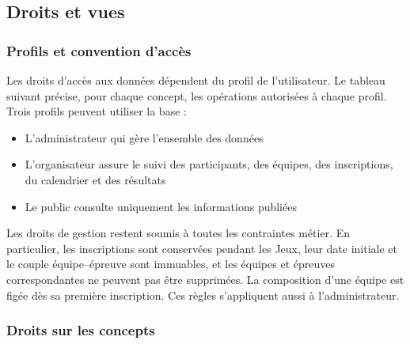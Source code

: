 \subsection{Droits et vues}

\subsubsection{Profils et convention d'accès}

Les droits d'accès aux données dépendent du profil de l'utilisateur. Le tableau suivant précise, pour chaque concept, les opérations autorisées à chaque profil. Trois profils peuvent utiliser la base : 
\begin{itemize}
  \item L'administrateur qui gère l'ensemble des données
  \item L'organisateur assure le suivi des participants, des équipes, des inscriptions, du calendrier et des résultats
  \item Le public consulte uniquement les informations publiées
\end{itemize}

Les droits de gestion restent soumis à toutes les contraintes métier. En particulier, les inscriptions sont conservées pendant les Jeux, leur date initiale et le couple équipe--épreuve sont immuables, et les équipes et épreuves correspondantes ne peuvent pas être supprimées. La composition d'une équipe est figée dès sa première inscription. Ces règles s'appliquent aussi à l'administrateur.

\subsubsection{Droits sur les concepts}

